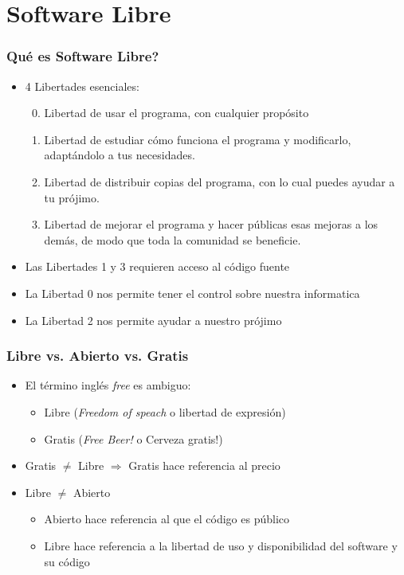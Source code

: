 \section{Software Libre}
\begin{frame}
  \frametitle{Qué es Software Libre?}
  \begin{itemize}
    \item 4 Libertades esenciales:
    \begin{enumerate}
      \setcounter{enumi}{-1}
      \item Libertad de \alert{usar} el programa, con cualquier propósito
      \item Libertad de \alert{estudiar} cómo funciona el programa y \alert{modificarlo}, adaptándolo a tus necesidades.
      \item Libertad de \alert{distribuir copias} del programa, con lo cual puedes ayudar a tu prójimo.
      \item Libertad de \alert{mejorar} el programa y \alert{hacer públicas} esas mejoras a los demás, de modo que toda la comunidad se beneficie. 
    \end{enumerate}
    \item Las \alert{Libertades 1} y \alert{3} requieren acceso al código fuente
    \item La \alert{Libertad 0} nos permite tener el control sobre nuestra informatica
    \item La \alert{Libertad 2} nos permite ayudar a nuestro prójimo
  \end{itemize}
\end{frame}
\begin{frame}
  \frametitle{Libre vs. Abierto vs. Gratis}
  \begin{itemize}
    \item El término inglés \alert{\emph{free}} es ambiguo:
    \begin{itemize}
      \item Libre (\emph{Freedom of speach} o libertad de expresión)
      \item Gratis (\emph{Free Beer!} o Cerveza gratis!)
    \end{itemize}
    \item Gratis \alert{$\ne$} Libre $\Rightarrow$ \alert{Gratis} hace referencia al precio
    \item Libre \alert{$\ne$} Abierto
    \begin{itemize}
      \item \alert{Abierto} hace referencia al que el código es público
      \item \alert{Libre} hace referencia a la libertad de uso y disponibilidad del software y su código
    \end{itemize}
  \end{itemize}
\end{frame}
